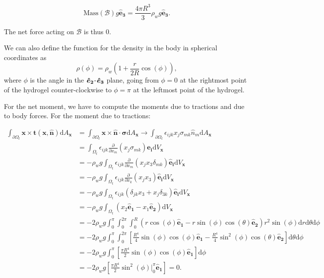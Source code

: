 \begin{equation*}
    \mathrm{Mass} (\mathcal{B})g \bm{\hat{e}_3} = \frac{4\pi R^3}{3}\rho_w g \bm{\hat{e}_3}.
\end{equation*}

The net force acting on $\mathcal{B}$ is thus 0.

We can also define the function for the density in the body in spherical coordinates as
\begin{equation*}
    \rho(\phi) = \rho_w (1+ \frac{r}{2R}\cos(\phi)),
\end{equation*}
where $\phi$ is the angle in the $\bm{\hat{e}_{2}}$-$\bm{\hat{e}_{3}}$ plane, going from $\phi=0$ at the rightmost point of the hydrogel counter-clockwise to $\phi=\pi$ at the leftmost point of the hydrogel.

For the net moment, we have to compute the moments due to tractions and due to body forces. For the moment due to tractions:

\begin{align*}
\int_{\partial \Omega_t} \bm{x} \times \bm{t}(\bm{x}, \bm{\hat{n}}) \mathrm{d}A_{\bm{x}} &=  \int_{\partial \Omega_t} \bm{x} \times \bm{\hat{n}} \cdot \bm{\sigma} \mathrm{d}A_{\bm{x}} \rightarrow  \int_{\partial \Omega_t} \epsilon_{ijk} x_j \sigma_{mk} \hat{n}_m \mathrm{d}A_{\bm{x}}\\
&= \int_{\Omega_t} \epsilon_{ijk} \frac{\partial}{\partial x_m} (x_j \sigma_{mk}) \bm{\hat{e}_i} \mathrm{d}V_{\bm{x}}\\
&= -\rho_w g \int_{\Omega_t} \epsilon_{ijk} \frac{\partial}{\partial x_m} (x_j x_3 \delta_{mk}) \bm{\hat{e}_i} \mathrm{d}V_{\bm{x}}\\
&= -\rho_w g \int_{\Omega_t} \epsilon_{ijk} \frac{\partial}{\partial x_k} (x_j x_3) \bm{\hat{e}_i} \mathrm{d}V_{\bm{x}}\\
&= -\rho_w g \int_{\Omega_t} \epsilon_{ijk} (\delta_{jk} x_3 + x_j \delta_{3k}) \bm{\hat{e}_i} \mathrm{d}V_{\bm{x}}\\
&= -\rho_w g \int_{\Omega_t} (x_2 \bm{\hat{e}_1} - x_1 \bm{\hat{e}_2}) \mathrm{d}V_{\bm{x}}\\
&= -2\rho_w g \int_0^\pi \int_0^{2\pi} \int _0^R (r\cos(\phi)\bm{\hat{e}_1} - r\sin(\phi)\cos(\theta)\bm{\hat{e}_2}) r^2 \sin(\phi) \mathrm{d}r \mathrm{d}\theta \mathrm{d}\phi\\
&= -2\rho_w g \int_0^\pi \int_0^{2\pi} \left[ \frac{R^4}{4} \sin(\phi)\cos(\phi)\bm{\hat{e}_1} - \frac{R^4}{4}\sin^2 (\phi) \cos(\theta)\bm{\hat{e}_2}\right] \mathrm{d}\theta \mathrm{d}\phi\\
&= -2\rho_w g \int_0^\pi \left[ \frac{\pi R^4}{2} \sin(\phi)\cos(\phi) \bm{\hat{e}_1} \right] \mathrm{d}\phi\\
&= -2\rho_w g \left[ \frac{\pi R^4}{2} \sin^2(\phi) |_0^{\pi} \bm{\hat{e}_1} \right] = 0.
\end{align*}


